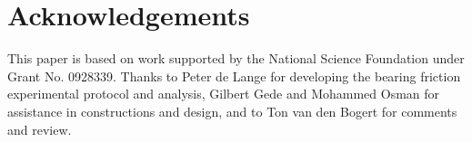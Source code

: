 \documentclass[10pt]{article}
\begin{document}
\section*{Acknowledgements}

This paper is based on work supported by the National Science Foundation under
Grant No. 0928339. Thanks to Peter de Lange for developing the bearing friction
experimental protocol and analysis, Gilbert Gede and Mohammed Osman for
assistance in constructions and design, and to Ton van den Bogert for comments
and review.



\end{document}
